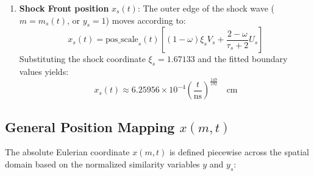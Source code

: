 \documentclass[11pt]{article}
\begin{document}
\begin{enumerate}
    \item \textbf{Shock Front position} $x_s(t)$:
    The outer edge of the shock wave ($m = m_s(t)$, or $y_s = 1$) moves according to:
    \begin{equation}
        x_s(t) = \text{pos\_scale}_s(t) \left[ (1-\omega)\xi_s V_s + \frac{2-\omega}{\tau_s+2} U_s \right]
    \end{equation}
    Substituting the shock coordinate $\xi_s = 1.67133$ and the fitted boundary values yields:
    \begin{equation}
        x_s(t) \approx 6.25956 \times 10^{-4} \left(\frac{t}{\text{ns}}\right)^{\frac{149}{192}} \quad \text{cm}
    \end{equation}
\end{enumerate}

\subsection{General Position Mapping $x(m,t)$}
The absolute Eulerian coordinate $x(m,t)$ is defined piecewise across the spatial domain based on the normalized similarity variables $y$ and $y_s$:
\end{document}

